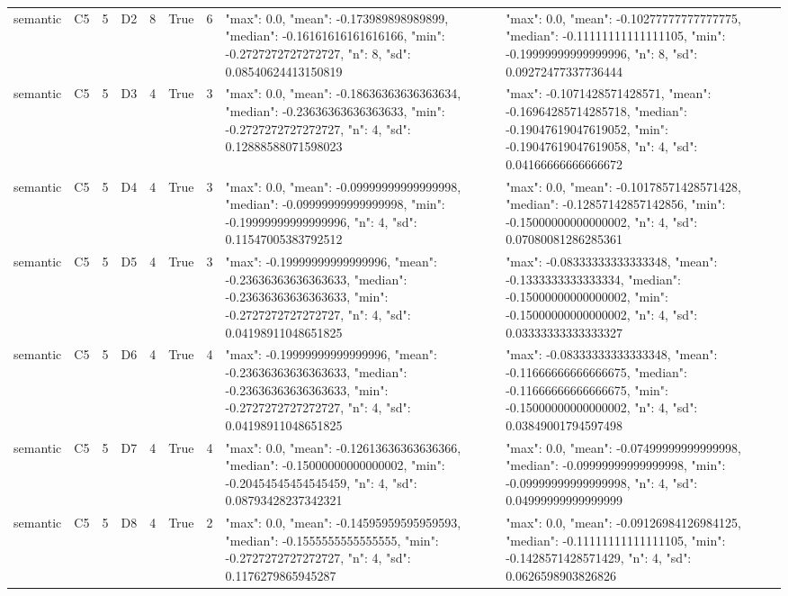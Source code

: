 \begin{tabular}{lllllllll}
semantic & C5 & 5 & D2 & 8 & True & 6 & {"max": 0.0, "mean": -0.173989898989899, "median": -0.16161616161616166, "min": -0.2727272727272727, "n": 8, "sd": 0.08540624413150819} & {"max": 0.0, "mean": -0.10277777777777775, "median": -0.11111111111111105, "min": -0.19999999999999996, "n": 8, "sd": 0.09272477337736444} \\
semantic & C5 & 5 & D3 & 4 & True & 3 & {"max": 0.0, "mean": -0.18636363636363634, "median": -0.23636363636363633, "min": -0.2727272727272727, "n": 4, "sd": 0.12888588071598023} & {"max": -0.1071428571428571, "mean": -0.16964285714285718, "median": -0.19047619047619052, "min": -0.19047619047619058, "n": 4, "sd": 0.04166666666666672} \\
semantic & C5 & 5 & D4 & 4 & True & 3 & {"max": 0.0, "mean": -0.09999999999999998, "median": -0.09999999999999998, "min": -0.19999999999999996, "n": 4, "sd": 0.11547005383792512} & {"max": 0.0, "mean": -0.10178571428571428, "median": -0.12857142857142856, "min": -0.15000000000000002, "n": 4, "sd": 0.07080081286285361} \\
semantic & C5 & 5 & D5 & 4 & True & 3 & {"max": -0.19999999999999996, "mean": -0.23636363636363633, "median": -0.23636363636363633, "min": -0.2727272727272727, "n": 4, "sd": 0.04198911048651825} & {"max": -0.08333333333333348, "mean": -0.1333333333333334, "median": -0.15000000000000002, "min": -0.15000000000000002, "n": 4, "sd": 0.03333333333333327} \\
semantic & C5 & 5 & D6 & 4 & True & 4 & {"max": -0.19999999999999996, "mean": -0.23636363636363633, "median": -0.23636363636363633, "min": -0.2727272727272727, "n": 4, "sd": 0.04198911048651825} & {"max": -0.08333333333333348, "mean": -0.11666666666666675, "median": -0.11666666666666675, "min": -0.15000000000000002, "n": 4, "sd": 0.03849001794597498} \\
semantic & C5 & 5 & D7 & 4 & True & 4 & {"max": 0.0, "mean": -0.12613636363636366, "median": -0.15000000000000002, "min": -0.20454545454545459, "n": 4, "sd": 0.08793428237342321} & {"max": 0.0, "mean": -0.07499999999999998, "median": -0.09999999999999998, "min": -0.09999999999999998, "n": 4, "sd": 0.04999999999999999} \\
semantic & C5 & 5 & D8 & 4 & True & 2 & {"max": 0.0, "mean": -0.14595959595959593, "median": -0.1555555555555555, "min": -0.2727272727272727, "n": 4, "sd": 0.1176279865945287} & {"max": 0.0, "mean": -0.09126984126984125, "median": -0.11111111111111105, "min": -0.1428571428571429, "n": 4, "sd": 0.0626598903826826} \\

\end{tabular}
